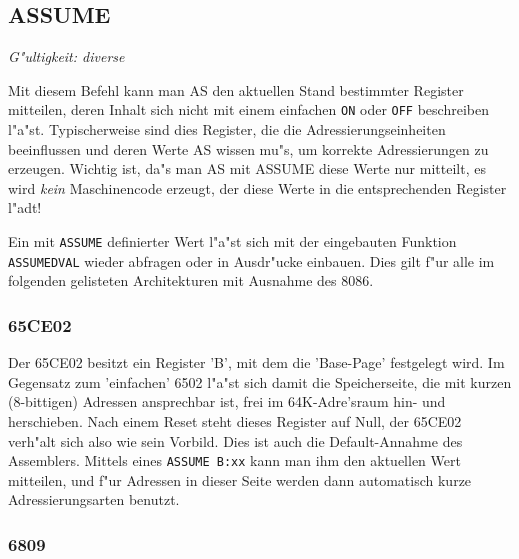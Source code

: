 \documentclass[12pt,a4paper,twoside]{report}
\makeatletter
\newcommand{\tty}[1]{{\tt #1}}
\newcommand{\ttindex}[1]{\index{#1@{\tt #1}}}
\makeatother
\begin{document}

\subsection{ASSUME}
\ttindex{ASSUME}


{\em G"ultigkeit: diverse}

Mit diesem Befehl kann man AS den aktuellen Stand bestimmter Register
mitteilen, deren Inhalt sich nicht mit einem einfachen \tty{ON} oder
\tty{OFF} beschreiben l"a"st.  Typischerweise sind dies Register, die die
Adressierungseinheiten beeinflussen und deren Werte AS wissen mu"s, um
korrekte Adressierungen zu erzeugen.  Wichtig ist, da"s man AS mit ASSUME
diese Werte nur mitteilt, es wird {\em kein} Maschinencode erzeugt, der
diese Werte in die entsprechenden Register l"adt!

Ein mit \tty{ASSUME} definierter Wert l"a"st sich mit der
eingebauten Funktion \tty{ASSUMEDVAL} wieder abfragen oder in
Ausdr"ucke einbauen.  Dies gilt f"ur alle im folgenden gelisteten
Architekturen mit Ausnahme des 8086.


\subsubsection{65CE02}

Der 65CE02 besitzt ein Register 'B', mit dem die 'Base-Page' festgelegt wird.
Im Gegensatz zum 'einfachen' 6502 l"a"st sich damit die Speicherseite, die
mit kurzen (8-bittigen) Adressen ansprechbar ist, frei im 64K-Adre'sraum hin-
und herschieben.  Nach einem Reset steht dieses Register auf Null, der 65CE02
verh"alt sich also wie sein Vorbild.  Dies ist auch die Default-Annahme des
Assemblers.  Mittels eines \tty{ASSUME B:xx} kann man ihm den aktuellen Wert
mitteilen, und f"ur Adressen in dieser Seite werden dann automatisch kurze
Adressierungsarten benutzt.


\subsubsection{6809}
\end{document}

